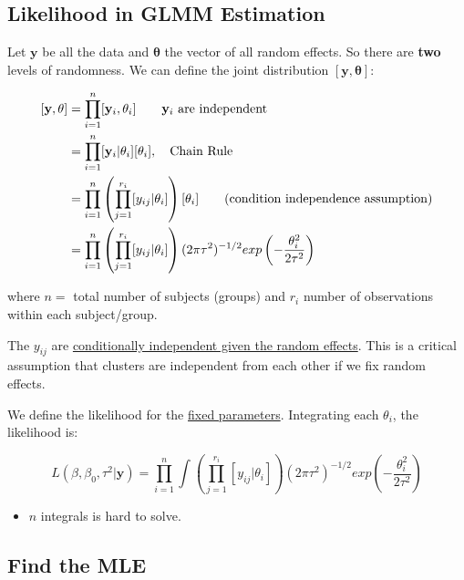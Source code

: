 \documentclass[
  letterpaper,
  DIV=11,
  numbers=noendperiod]{scrreprt}
\providecommand{\tightlist}{%
  \setlength{\itemsep}{0pt}\setlength{\parskip}{0pt}}\usepackage{longtable,booktabs,array}
\begin{document}
\hypertarget{likelihood-in-glmm-estimation}{%
\subsection*{Likelihood in GLMM
Estimation}\label{likelihood-in-glmm-estimation}}

Let \(\mathbf{y}\) be all the data and \(\mathbf{\theta}\) the vector of
all random effects. So there are \textbf{two} levels of randomness. We
can define the joint distribution \([\mathbf{y}, \mathbf{\theta}]\):

\[
\begin{align*}
[\mathbf{y}, \mathbf{\theta}] &= \prod_{i=1}^{n} [\mathbf{y}_i, \theta_i] \qquad \mathbf{y}_i \text{ are independent}\\
&= \prod_{i=1}^n [\mathbf{y}_i|\theta_i][\theta_i], \quad \text{Chain Rule}\\
&= \prod_{i=1}^n \left(\prod_{j=1}^{r_i} [y_{ij}|\theta_i]\right)[\theta_i] \qquad (\bf{\text{condition independence assumption}})\\
&= \prod_{i=1}^n \left(\prod_{j=1}^{r_i} [y_{ij} |\theta_i]\right) (2\pi \tau^2)^{-1/2} exp\left(-\frac{\theta_i^2}{2\tau^2}\right)
\end{align*}
\]

where \(n=\) total number of subjects (groups) and \(r_i\) number of
observations within each subject/group.

The \(y_{ij}\) are \ul{conditionally independent given the random
effects}. This is a critical assumption that clusters are independent
from each other if we fix random effects.

We define the likelihood for the \ul{fixed parameters}. Integrating each
\(\theta_i\), the likelihood is:

\[
L(\beta,\beta_0,\tau^2|\mathbf{y}) = \prod_{i=1}^n \int\left(\prod_{j=1}^{r_i} [y_{ij} |\theta_i]\right) (2\pi \tau^2)^{-1/2} exp\left(-\frac{\theta_i^2}{2\tau^2}\right)
\]

\begin{itemize}
\tightlist
\item
  \(n\) integrals is hard to solve.
\end{itemize}

\hypertarget{find-the-mle}{%
\subsection*{Find the MLE}\label{find-the-mle}}
\end{document}
